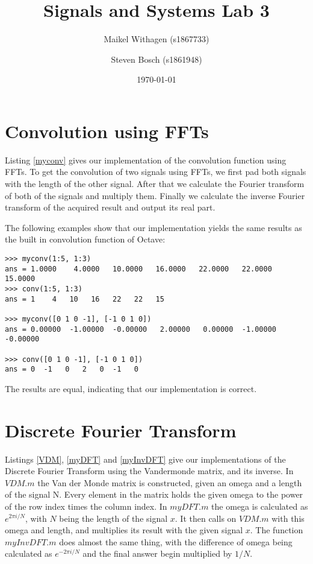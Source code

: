 \documentclass{article}
\title{Signals and Systems Lab 3}
\author{Maikel Withagen (s1867733) \and Steven Bosch (s1861948)}
\date{\today}
\begin{document}
\maketitle

\section{Convolution using FFTs}
Listing \ref{myconv} gives our implementation of the convolution function using FFTs. To get the convolution of two signals using FFTs, we first pad both signals with the length of the other signal. After that we calculate the Fourier transform of both of the signals and multiply them. Finally we calculate the inverse Fourier transform of the acquired result and output its real part.

The following examples show that our implementation yields the same results as the built in convolution function of Octave:
\begin{lstlisting}
>>> myconv(1:5, 1:3)
ans = 1.0000    4.0000   10.0000   16.0000   22.0000   22.0000   15.0000
>>> conv(1:5, 1:3)
ans = 1    4   10   16   22   22   15

>>> myconv([0 1 0 -1], [-1 0 1 0])
ans = 0.00000  -1.00000  -0.00000   2.00000   0.00000  -1.00000  -0.00000

>>> conv([0 1 0 -1], [-1 0 1 0])
ans = 0  -1   0   2   0  -1   0
\end{lstlisting}
The results are equal, indicating that our implementation is correct. 

 
 
\section{Discrete Fourier Transform}
Listings \ref{VDM}, \ref{myDFT} and \ref{myInvDFT} give our implementations of the Discrete Fourier Transform using the Vandermonde matrix, and its inverse. In $VDM.m$ the Van der Monde matrix is constructed, given an omega and a length of the signal N. Every element in the matrix holds the given omega to the power of the row index times the column index. In $myDFT.m$ the omega is calculated as $e^{2\pi i/N}$, with $N$ being the length of the signal $x$. It then calls on $VDM.m$ with this omega and length, and multiplies its result with the given signal $x$. The function $myInvDFT.m$ does almost the same thing, with the difference of omega being calculated as $e^{-2\pi i/N}$ and the final answer begin multiplied by $1/N$.
\end{document}
